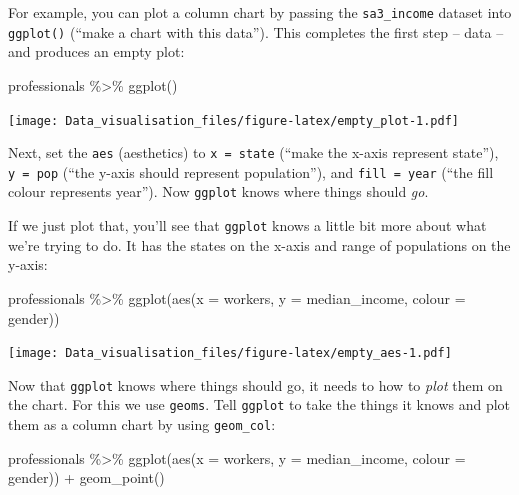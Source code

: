 \documentclass[
]{book}
\newenvironment{Shaded}{\begin{snugshade}}{\end{snugshade}}
\newcommand{\AttributeTok}[1]{\textcolor[rgb]{0.77,0.63,0.00}{#1}}
\newcommand{\FunctionTok}[1]{\textcolor[rgb]{0.00,0.00,0.00}{#1}}
\newcommand{\NormalTok}[1]{#1}
\newcommand{\SpecialCharTok}[1]{\textcolor[rgb]{0.00,0.00,0.00}{#1}}
\begin{document}
For example, you can plot a column chart by passing the \texttt{sa3\_income} dataset into \texttt{ggplot()} (``make a chart with this data''). This completes the first step -- data -- and produces an empty plot:

\begin{Shaded}
\begin{Highlighting}[]
\NormalTok{professionals }\SpecialCharTok{\%\textgreater{}\%} 
        \FunctionTok{ggplot}\NormalTok{()}
\end{Highlighting}
\end{Shaded}

\texttt{[image: Data\_visualisation\_files/figure-latex/empty\_plot-1.pdf]}

Next, set the \texttt{aes} (aesthetics) to \texttt{x\ =\ state} (``make the x-axis represent state''), \texttt{y\ =\ pop} (``the y-axis should represent population''), and \texttt{fill\ =\ year} (``the fill colour represents year''). Now \texttt{ggplot} knows where things should \emph{go}.

If we just plot that, you'll see that \texttt{ggplot} knows a little bit more about what we're trying to do. It has the states on the x-axis and range of populations on the y-axis:

\begin{Shaded}
\begin{Highlighting}[]
\NormalTok{professionals }\SpecialCharTok{\%\textgreater{}\%} 
        \FunctionTok{ggplot}\NormalTok{(}\FunctionTok{aes}\NormalTok{(}\AttributeTok{x =}\NormalTok{ workers,}
                   \AttributeTok{y =}\NormalTok{ median\_income,}
                   \AttributeTok{colour =}\NormalTok{ gender))}
\end{Highlighting}
\end{Shaded}

\texttt{[image: Data\_visualisation\_files/figure-latex/empty\_aes-1.pdf]}

Now that \texttt{ggplot} knows where things should go, it needs to how to \emph{plot} them on the chart. For this we use \texttt{geoms}. Tell \texttt{ggplot} to take the things it knows and plot them as a column chart by using \texttt{geom\_col}:

\begin{Shaded}
\begin{Highlighting}[]
\NormalTok{professionals }\SpecialCharTok{\%\textgreater{}\%}
        \FunctionTok{ggplot}\NormalTok{(}\FunctionTok{aes}\NormalTok{(}\AttributeTok{x =}\NormalTok{ workers,}
                   \AttributeTok{y =}\NormalTok{ median\_income,}
                   \AttributeTok{colour =}\NormalTok{ gender)) }\SpecialCharTok{+} 
        \FunctionTok{geom\_point}\NormalTok{()}
\end{Highlighting}
\end{Shaded}
\end{document}

